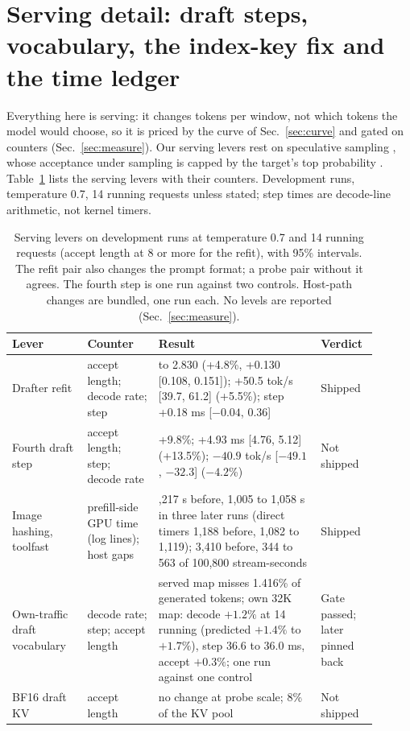 \section{Serving detail: draft steps, vocabulary, the index-key fix and the time ledger}\label{app:serving}

Everything here is serving: it changes tokens per window, not which tokens the model would choose, so it is priced by the curve of Sec.~\ref{sec:curve} and gated on counters (Sec.~\ref{sec:measure}). %
Our serving levers rest on speculative sampling \citep{leviathan2022speculative,chen2023speculative}, whose acceptance under sampling is capped by the target's top probability \citep{li2026bebop}. %
Table~\ref{tab:levers} lists the serving levers with their counters. Development runs, temperature 0.7, 14 running requests unless stated; step times are decode-line arithmetic, not kernel timers. %

\begin{table}[!htb]
\caption{Serving levers on development runs at temperature 0.7 and 14 running requests (accept length at 8 or more for the refit), with 95\% intervals. The refit pair also changes the prompt format; a probe pair without it agrees. The fourth step is one run against two controls. Host-path changes are bundled, one run each. No levels are reported (Sec.~\ref{sec:measure}).}\label{tab:levers} %
\footnotesize
\setlength{\tabcolsep}{3pt}
\begin{tabular}{@{}>{\raggedright\arraybackslash}p{0.19\linewidth}>{\raggedright\arraybackslash}p{0.18\linewidth}>{\raggedright\arraybackslash}p{0.41\linewidth}>{\raggedright\arraybackslash}p{0.12\linewidth}@{}}
\toprule
Lever & Counter & Result & Verdict \\
\midrule
Drafter refit \citep{ursuciprian2026d3,albucino2026drafter} & accept length; decode rate; step & 2.699 to 2.830 (+4.8\%, +0.130 [0.108, 0.151]); +50.5 tok/s [39.7, 61.2] (+5.5\%); step +0.18 ms [$-0.04$, 0.36] & Shipped \\ %
Fourth draft step & accept length; step; decode rate & +9.8\%; +4.93 ms [4.76, 5.12] (+13.5\%); $-40.9$ tok/s [$-49.1$, $-32.3$] ($-4.2$\%) & Not shipped \\ %
Image hashing, toolfast & prefill-side GPU time (log lines); host gaps & 1,217 s before, 1,005 to 1,058 s in three later runs (direct timers 1,188 before, 1,082 to 1,119); 3,410 before, 344 to 563 of 100,800 stream-seconds & Shipped \\ %
Own-traffic draft vocabulary & decode rate; step; accept length & served map misses 1.416\% of generated tokens; own 32K map: decode $+1.2\%$ at 14 running (predicted $+1.4\%$ to $+1.7\%$), step 36.6 to 36.0 ms, accept $+0.3\%$; one run against one control & Gate passed; later pinned back \\ %
BF16 draft KV & accept length & no change at probe scale; 8\% of the KV pool & Not shipped \\ %
\bottomrule
\end{tabular}
\end{table}

